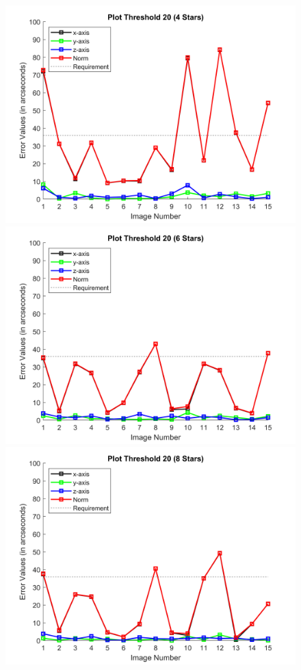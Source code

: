 \documentclass[../../main.tex]{subfiles}
\begin{document}
{{{\begin{figure}
\centering
\includegraphics[scale=0.50]{Figures/GNC/Result_Plot_Threshold_20_4stars.png}
\includegraphics[scale=0.50]{Figures/GNC/Result_Plot_Threshold_20_6stars.png}
\includegraphics[scale=0.50]{Figures/GNC/Result_Plot_Threshold_20_8stars.png}

\end{figure}}}}
\end{document}
